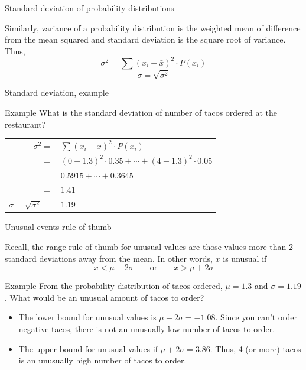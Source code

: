\documentclass[xcolor=table, handout]{beamer}
\begin{document}
\begin{frame}{Standard deviation of probability distributions}
\begin{block}{}
Similarly, variance of a probability distribution is the weighted mean of difference from the mean squared and standard deviation is the square root of variance.\\
\medskip
Thus,
\[\sigma^2 = \sum (x_i - \bar x )^2 \cdot P(x_i)\]
\[\sigma = \sqrt{\sigma^2}\]
\end{block}
\end{frame}

\begin{frame}{Standard deviation, example}
\begin{exampleblock}{Example}
What is the standard deviation of number of tacos ordered at the restaurant?\\
\medskip
\pause
{\centering \renewcommand{\arraystretch}{1}
\begin{tabular}{r l}
$\sigma^2 =$ & $\sum (x_i - \bar x )^2 \cdot P(x_i)$\\
$=$ & $(0-1.3)^2 \cdot 0.35 + \cdots + (4-1.3)^2 \cdot 0.05$\\
$=$ & $0.5915 + \cdots + 0.3645$\\
$=$ & $1.41$\\
\pause$\sigma = \sqrt{\sigma^2} = $ & $1.19$
\end{tabular}\par
\renewcommand{\arraystretch}{1.5}}
\end{exampleblock}
\end{frame}


\begin{frame}{Unusual events rule of thumb}
\begin{block}{}
Recall, the range rule of thumb for unusual values are those values more than 2 standard deviations away from the mean. In other words, $x$ is unusual if
\[ x < \mu - 2\sigma \qquad \text{or} \qquad x > \mu + 2 \sigma\]
\end{block}
\pause
\begin{exampleblock}{Example}
From the probability distribution of tacos ordered, $\mu = 1.3$ and $\sigma = 1.19$. What would be an unusual amount of tacos to order?
\begin{itemize}
\pause\item The lower bound for unusual values is $\mu - 2\sigma = -1.08$. Since you can't order negative tacos, there is not an unusually low number of tacos to order.
\pause\item The upper bound for unusual values if $\mu + 2\sigma = 3.86$. Thus, 4 (or more) tacos is an unusually high number of tacos to order.
\end{itemize}
\end{exampleblock}
\end{frame}
\end{document}
